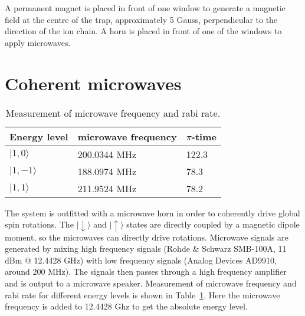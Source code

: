 A permanent magnet is placed in front of one window to generate a magnetic field at the centre of the trap, approximately 5 Gauss, perpendicular to the direction of the ion chain. A horn is placed in front of one of the windows to apply microwaves.



\section {Coherent microwaves}

\begin{table}
    \centering
    \caption{Measurement of microwave frequency and rabi rate.}
    \begin{tabular}{lll}
        \toprule
        Energy level   & microwave frequency & $\pi$-time \\
        \midrule
        $|1,0\rangle$  & 200.0344 MHz        & 122.3      \\
        $|1,-1\rangle$ & 188.0974 MHz        & 78.3       \\
        $|1,1\rangle$  & 211.9524 MHz        & 78.2       \\
        \bottomrule
    \end{tabular}
    \label{tab:microwave}
\end{table}

The system is outfitted with a microwave horn in order to coherently drive global spin rotations.
The $|\downarrow\rangle$ and $|\uparrow\rangle$ states are directly coupled by a magnetic dipole moment, so the
microwaves can directly drive rotations. Microwave signals are generated by mixing high frequency signals (Rohde \& Schwarz SMB-100A, 11 dBm @ 12.4428 GHz) with low frequency signals (Analog Devices AD9910, around 200 MHz). The signals then passes through a high frequency amplifier and is output to a microwave speaker. Measurement of microwave frequency and rabi rate for different energy levels is shown in Table~\ref{tab:microwave}. Here the microwave frequency is added to 12.4428 Ghz to get the absolute energy level.
